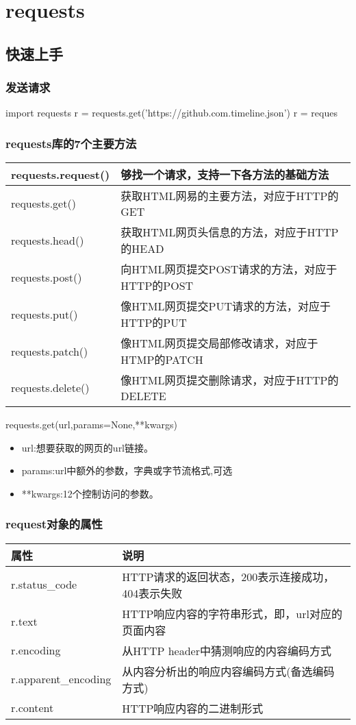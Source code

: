 \chapter{requests}
\section{快速上手}
\subsection{发送请求}
\begin{python}
import requests
r = requests.get('https://github.com.timeline.json')
r = reques
\end{python}
\subsection{requests库的7个主要方法}
\begin{center}
\begin{tabular}{|p{3cm}|p{12cm}|}
\hline
requests.request()&够找一个请求，支持一下各方法的基础方法\\
\hline
requests.get()&获取HTML网易的主要方法，对应于HTTP的GET\\
\hline
requests.head()&获取HTML网页头信息的方法，对应于HTTP的HEAD\\
\hline
requests.post()&向HTML网页提交POST请求的方法，对应于HTTP的POST\\
\hline
requests.put()&像HTML网页提交PUT请求的方法，对应于HTTP的PUT\\
\hline
requests.patch()&像HTML网页提交局部修改请求，对应于HTMP的PATCH\\
\hline
requests.delete()&像HTML网页提交删除请求，对应于HTTP的DELETE\\
\hline
\end{tabular}
\end{center}
requests.get(url,params=None,**kwargs)
\begin{itemize}
\item url:想要获取的网页的url链接。
\item params:url中额外的参数，字典或字节流格式,可选
\item **kwargs:12个控制访问的参数。
\end{itemize}
\subsection{request对象的属性}
\begin{center}
\begin{tabular}{|p{3.5cm}|p{12cm}|}
\hline
属性&说明\\
\hline
r.status\_code&HTTP请求的返回状态，200表示连接成功，404表示失败\\
\hline
r.text&HTTP响应内容的字符串形式，即，url对应的页面内容\\
\hline
r.encoding&从HTTP header中猜测响应的内容编码方式\\
\hline
r.apparent\_encoding&从内容分析出的响应内容编码方式(备选编码方式)\\
\hline
r.content&HTTP响应内容的二进制形式\\
\hline
\end{tabular}
\end{center}
